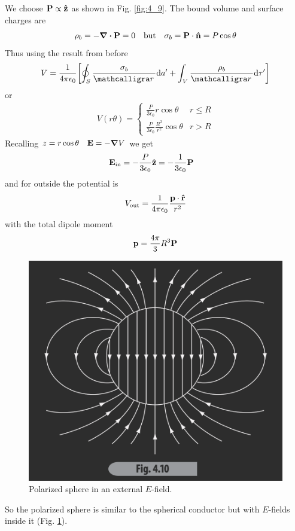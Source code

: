 \documentclass[../main.tex]{subfiles}
\begin{document}
We choose $\vb P \propto \vu z$ as shown in Fig. \ref{fig:4_9}. The bound volume and surface charges are 
\begin{align*}
    \rho_b = -\div \vb P = 0 \qqtext{but} \sigma_b = \vb P \cdot \vu n = P \cos\theta
\end{align*}
Thus using the result from before
\begin{align*}
    V = \ke \qt[
        \oint_S \frac{\sigma_b}{\scriptr} \dd a' + \int_V \frac{\rho_b}{\scriptr} \dd\tau'
    ]
\end{align*}
or 
\begin{align*}
    V(r \theta) = \begin{cases}
        \frac{P}{3\epsilon_0} r \cos\theta & r \leq R \\
        \frac{P}{3\epsilon_0} \frac{R^3}{r^2} \cos\theta & r > R
    \end{cases}
\end{align*}
Recalling $z = r \cos\theta \quad \vb E = -\grad V$ we get
\begin{align*}
    \vb E_\text{in} &= -\frac{P}{3\epsilon_0} \vu z = -\frac{1}{3\epsilon_0} \vb P
\end{align*}
and for outside the potential is
\begin{align*}
    V_\text{out} = \frac{1}{4\pi\epsilon_0} \frac{\vb p \cdot \vu r}{r^2}
\end{align*}
with the total dipole moment
\begin{align*}
    \vb p = \frac{4\pi}{3} R^3 \vb P
\end{align*}

\begin{figure}[ht]
    \centering
    \includegraphics[width=0.3\linewidth]{fig4_10.png}
    \caption{Polarized sphere in an external $E$-field.}
    \label{fig:4_10}
\end{figure}

So the polarized sphere is similar to the spherical conductor but with $E$-fields inside it (Fig. \ref{fig:4_10}).
\end{document}
